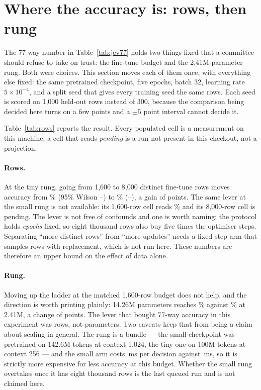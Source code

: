\section{Where the accuracy is: rows, then rung}\label{sec:rows-and-rung}

The 77-way number in Table~\ref{tab:jev77} holds two things fixed that a
committee should refuse to take on trust: the fine-tune budget and the
2.41M-parameter rung. Both were choices. This section moves each of them once,
with everything else fixed: the same pretrained checkpoint, five epochs, batch
32, learning rate $5\times10^{-4}$, and a split seed that gives every training
seed the same rows. Each seed is scored on 1{,}000 held-out rows instead of
300, because the comparison being decided here turns on a few points and a
$\pm 5$ point interval cannot decide it.

Table~\ref{tab:rows} reports the result. Every populated cell is a measurement
on this machine; a cell that reads \emph{pending} is a run not present in this
checkout, not a projection.



\paragraph{Rows.} At the tiny rung, going from 1{,}600 to 8{,}000 distinct
fine-tune rows moves accuracy from \RowTinyBaseAcc\% (95\% Wilson
\RowTinyBaseLo--\RowTinyBaseHi) to \RowTinyWideAcc\% (\RowTinyWideLo--\RowTinyWideHi),
a gain of \RowTinyGain{} points. The same lever at the small rung is not available:
its 1{,}600-row cell reads \RowSmallBaseAcc\% and its 8{,}000-row cell is
pending. The lever is not free of confounds and one is
worth naming: the protocol holds \emph{epochs} fixed, so eight thousand rows
also buy five times the optimiser steps. Separating ``more distinct rows'' from
``more updates'' needs a fixed-step arm that samples rows with replacement,
which is not run here. These numbers are therefore an upper bound on the effect
of data alone.

\paragraph{Rung.} Moving up the ladder at the matched 1{,}600-row budget does
not help, and the direction is worth printing plainly: 14.26M parameters
reaches \RowRungBase\% against \RowRungTiny\% at 2.41M, a change of
\RowRungGain{} points. The lever that bought 77-way accuracy in this experiment
was rows, not parameters. Two caveats keep that from being a claim about
scaling in general. The rung is a bundle --- the small checkpoint was pretrained
on 142.6M tokens at context 1{,}024, the tiny one on 100M tokens at context 256
--- and the small arm costs \RowSmallBaseLat\,ms per decision against \RowTinyBaseLat\,ms,
so it is strictly more expensive for less accuracy at this budget. Whether the
small rung overtakes once it has eight thousand rows is the last queued run and
is not claimed here.

